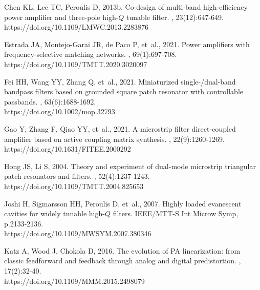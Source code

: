 \documentclass[twoside,twocolumn]{article}
\begin{document}
{{\begin{thebibliography}{}
Chen KL, Lee TC, Peroulis D, 2013b.
\newblock Co-design of multi-band high-efficiency power amplifier and three-pole high-$Q$ tunable filter.
, 23(12):647-649. \\
  https://doi.org/10.1109/LMWC.2013.2283876

Estrada JA, Montejo-Garai JR, de Paco P, {et~al.}, 2021.
\newblock Power amplifiers with frequency-selective matching networks.
, 69(1):697-708. \\
  https://doi.org/10.1109/TMTT.2020.3020097

Fei HH, Wang YY, Zhang Q, {et~al.}, 2021.
\newblock Miniaturized single-/dual-band bandpass filters based on grounded square patch resonator with controllable passbands.
, 63(6):1688-1692. \\
  https://doi.org/10.1002/mop.32793

Gao Y, Zhang F, Qiao YY, {et~al.}, 2021.
\newblock A microstrip filter direct-coupled amplifier based on active coupling matrix synthesis.
, 22(9):1260-1269. \\
  https://doi.org/10.1631/FITEE.2000292

Hong JS, Li S, 2004.
\newblock Theory and experiment of dual-mode microstrip triangular patch resonators and filters.
, 52(4):1237-1243. \\
  https://doi.org/10.1109/TMTT.2004.825653

Joshi H, Sigmarsson HH, Peroulis D, {et~al.}, 2007.
\newblock Highly loaded evanescent cavities for widely tunable high-$Q$ filters.
\newblock IEEE/MTT-S Int Microw Symp, p.2133-2136. \\
  https://doi.org/10.1109/MWSYM.2007.380346

Katz A, Wood J, Chokola D, 2016.
\newblock The evolution of PA linearization: from classic feedforward and feedback through analog and digital predistortion.
, 17(2):32-40. \\
  https://doi.org/10.1109/MMM.2015.2498079


\end{thebibliography}}}
\end{document}
